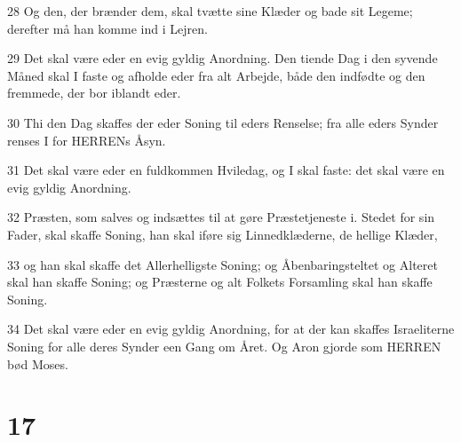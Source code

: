\par 28 Og den, der brænder dem, skal tvætte sine Klæder og bade sit Legeme; derefter må han komme ind i Lejren.
\par 29 Det skal være eder en evig gyldig Anordning. Den tiende Dag i den syvende Måned skal I faste og afholde eder fra alt Arbejde, både den indfødte og den fremmede, der bor iblandt eder.
\par 30 Thi den Dag skaffes der eder Soning til eders Renselse; fra alle eders Synder renses I for HERRENs Åsyn.
\par 31 Det skal være eder en fuldkommen Hviledag, og I skal faste: det skal være en evig gyldig Anordning.
\par 32 Præsten, som salves og indsættes til at gøre Præstetjeneste i. Stedet for sin Fader, skal skaffe Soning, han skal iføre sig Linnedklæderne, de hellige Klæder,
\par 33 og han skal skaffe det Allerhelligste Soning; og Åbenbaringsteltet og Alteret skal han skaffe Soning; og Præsterne og alt Folkets Forsamling skal han skaffe Soning.
\par 34 Det skal være eder en evig gyldig Anordning, for at der kan skaffes Israeliterne Soning for alle deres Synder een Gang om Året. Og Aron gjorde som HERREN bød Moses.

\chapter{17}

